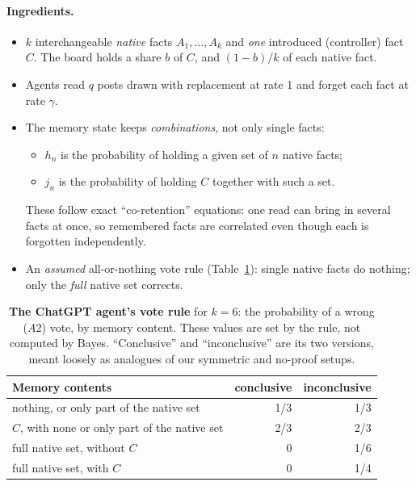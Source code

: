 \documentclass[10pt,a4paper]{article}
\begin{document}
\paragraph{Ingredients.}
\begin{itemize}
\item $k$ interchangeable \emph{native} facts $A_1,\dots,A_k$ and \emph{one} introduced (controller) fact $C$. The board
  holds a share $b$ of $C$, and $(1-b)/k$ of each native fact.
\item Agents read $q$ posts drawn with replacement at rate 1 and forget each fact at rate $\gamma$.
\item The memory state keeps \emph{combinations}, not only single facts:
  \begin{itemize}
  \item $h_n$ is the probability of holding a given set of $n$ native facts;
  \item $j_n$ is the probability of holding $C$ together with such a set.
  \end{itemize}
  These follow exact ``co-retention'' equations: one read can bring in several facts at once, so remembered facts are
  correlated even though each is forgotten independently.
\item An \emph{assumed} all-or-nothing vote rule (Table~\ref{tab:gptrule}): single native facts do nothing; only the
  \emph{full} native set corrects.
\end{itemize}
\begin{table}[h]
\centering\small
\caption{\textbf{The ChatGPT agent's vote rule} for $k=6$: the probability of a wrong ($A2$) vote, by memory content.
These values are set by the rule, not computed by Bayes. ``Conclusive'' and ``inconclusive'' are its two versions,
meant loosely as analogues of our symmetric and no-proof setups.}
\label{tab:gptrule}
\begin{tabular}{@{}lrr@{}}\toprule
Memory contents & conclusive & inconclusive\\\midrule
nothing, or only part of the native set & 1/3 & 1/3\\
$C$, with none or only part of the native set & 2/3 & 2/3\\
full native set, without $C$ & 0 & 1/6\\
full native set, with $C$ & 0 & 1/4\\\bottomrule
\end{tabular}
\end{table}
\end{document}
